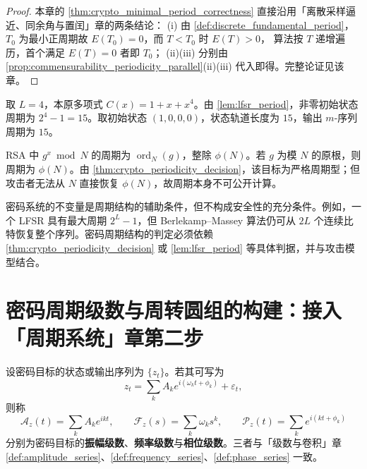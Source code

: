 \begin{proof}
本章的 \cref{thm:crypto_minimal_period_correctness} 直接沿用「离散采样逼近、同余角与置闰」章的两条结论：
(i) 由 \cref{def:discrete_fundamental_period}，$T_0$ 为最小正周期故 $E(T_0)=0$，而 $T<T_0$ 时 $E(T)>0$，
算法按 $T$ 递增遍历，首个满足 $E(T)=0$ 者即 $T_0$；
(ii)(iii) 分别由 \cref{prop:commensurability_periodicity_parallel}(ii)(iii) 代入即得。完整论证见该章。
\end{proof}

\begin{example}\label{ex:crypto_lfsr_period}
取 \(L=4\)，本原多项式 \(C(x)=1+x+x^4\)。由 \cref{lem:lfsr_period}，非零初始状态周期为 \(2^4-1=15\)。取初始状态 \((1,0,0,0)\)，状态轨道长度为 \(15\)，输出 \(m\)-序列周期为 \(15\)。
\end{example}

\begin{example}\label{ex:rsa_period}
RSA 中 \(g^x\bmod N\) 的周期为 \(\operatorname{ord}_N(g)\)，整除 \(\phi(N)\)。若 \(g\) 为模 \(N\) 的原根，则周期为 \(\phi(N)\)。由 \cref{thm:crypto_periodicity_decision}，该目标为严格周期型；但攻击者无法从 \(N\) 直接恢复 \(\phi(N)\)，故周期本身不可公开计算。
\end{example}

\begin{remark}[密码不变量不保证周期安全]\label{rem:crypto_invariant_not_period}
密码系统的不变量是周期结构的辅助条件，但不构成安全性的充分条件。例如，一个 LFSR 具有最大周期 \(2^L-1\)，但 Berlekamp--Massey 算法仍可从 \(2L\) 个连续比特恢复整个序列。密码周期结构的判定必须依赖 \cref{thm:crypto_periodicity_decision} 或 \cref{lem:lfsr_period} 等具体判据，并与攻击模型结合。
\end{remark}

\section{密码周期级数与周转圆组的构建：接入「周期系统」章第二步}
\label{sec:crypto_series_construction}

\begin{definition}\label{def:crypto_series}
设密码目标的状态或输出序列为 \(\{z_t\}\)。若其可写为
\[
z_t=\sum_k A_k e^{i(\omega_k t+\phi_k)}+\varepsilon_t,
\]
则称
\[
\mathcal A_z(t)=\sum_k A_k e^{ikt},\qquad
\mathcal F_z(s)=\sum_k \omega_k s^k,\qquad
\mathcal P_z(t)=\sum_k e^{i(kt+\phi_k)}
\]
分别为密码目标的\textbf{振幅级数}、\textbf{频率级数}与\textbf{相位级数}。三者与「级数与卷积」章 \cref{def:amplitude_series}、\cref{def:frequency_series}、\cref{def:phase_series} 一致。
\end{definition}

